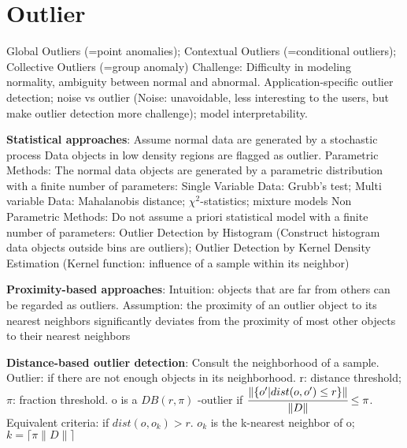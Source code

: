\documentclass[10pt,twocolumn]{article}
\begin{document}
\section{Outlier}
Global Outliers (=point anomalies); Contextual Outliers (=conditional outliers); Collective Outliers (=group anomaly)
Challenge: Difficulty in modeling normality, ambiguity between normal and abnormal. Application-specific outlier detection; noise vs outlier (Noise: unavoidable, less interesting to the users, but make outlier detection more challenge); model interpretability. 

\textbf{Statistical approaches}: Assume
normal data are generated by a stochastic process Data objects in low density regions are flagged as outlier. 
Parametric Methods: The normal data objects are generated by a parametric distribution with a finite number of parameters: Single Variable Data: Grubb's test; Multi variable Data: Mahalanobis distance; $\chi^2$-statistics; mixture models
Non Parametric Methods: Do not assume a priori statistical model with a finite number of parameters: Outlier Detection by Histogram (Construct
histogram data objects outside bins are outliers); Outlier Detection by Kernel Density Estimation (Kernel
function: influence of a sample within its neighbor)

\textbf{Proximity-based approaches}: Intuition:
objects that are far from others can be regarded as outliers. Assumption: the proximity of an outlier object to its nearest neighbors significantly deviates from the proximity of most other objects to their nearest neighbors

\textbf{Distance-based outlier detection}: Consult the neighborhood of a sample. Outlier: if there are not enough objects in its neighborhood. 
r: distance threshold; $\pi$: fraction threshold. o is a $DB(r,\pi)$ -outlier if $\cfrac{\|\{o'|dist(o,o')\le r\}\|}{\|D\|}\le \pi$. Equivalent criteria: if $dist(o,o_k)>r$. $o_k$ is the k-nearest neighbor of o; $k=\lceil\pi\|D\|\rceil$
\end{document}
